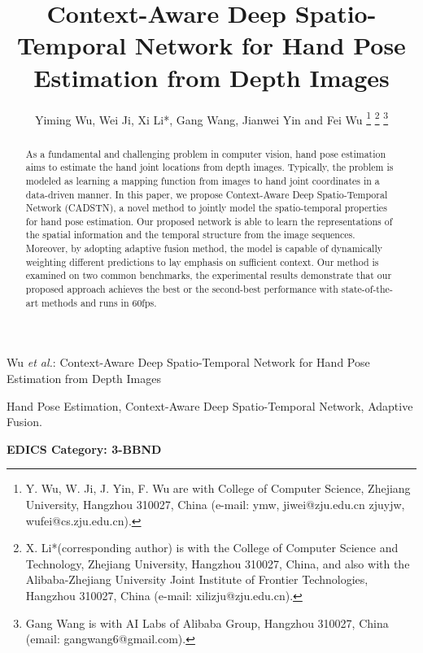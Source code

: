 \documentclass[journal,comsoc]{IEEEtran}
\begin{document}
\title{Context-Aware Deep Spatio-Temporal Network for Hand Pose Estimation from Depth Images}

\author{{Yiming Wu, Wei Ji, Xi Li*, Gang Wang, Jianwei Yin and Fei Wu}%
\thanks{Y. Wu, W. Ji, J. Yin, F. Wu are with College of Computer Science, Zhejiang University, Hangzhou 310027, China (e-mail: ymw, jiwei@zju.edu.cn zjuyjw, wufei@cs.zju.edu.cn).}
\thanks{X. Li*(corresponding author) is with the College of Computer Science and Technology, Zhejiang University, Hangzhou 310027, China, and also with the Alibaba-Zhejiang University Joint Institute of Frontier Technologies, Hangzhou 310027, China (e-mail: xilizju@zju.edu.cn).}
\thanks{Gang Wang is with AI Labs of Alibaba Group, Hangzhou 310027, China (email: gangwang6@gmail.com).}}

%
{Wu \MakeLowercase{\textit{et al.}}: Context-Aware Deep Spatio-Temporal Network for Hand Pose Estimation from Depth Images}

\maketitle

\begin{abstract}
As a fundamental and challenging problem in computer vision, hand pose estimation
aims to estimate the hand joint locations from depth images. Typically, the problem is modeled as
learning a mapping function from images to hand joint coordinates in a data-driven manner.
In this paper, we propose Context-Aware Deep Spatio-Temporal Network (CADSTN), a novel method to jointly
model the spatio-temporal properties for hand pose estimation. Our proposed network is able to learn the
representations of the spatial information
and the temporal structure from the image sequences. Moreover, by adopting adaptive fusion method,
the model is capable of dynamically weighting different predictions to lay emphasis on sufficient context.
Our method is examined on two common benchmarks,
the experimental results demonstrate that our proposed approach achieves
the best or the second-best performance with state-of-the-art methods and runs in 60fps.
\end{abstract}
\begin{IEEEkeywords}
Hand Pose Estimation, Context-Aware Deep Spatio-Temporal Network, Adaptive Fusion.
\end{IEEEkeywords}


\ifCLASSOPTIONpeerreview
\begin{center} \bfseries EDICS Category: 3-BBND \end{center}
\fi
\IEEEpeerreviewmaketitle
\end{document}
